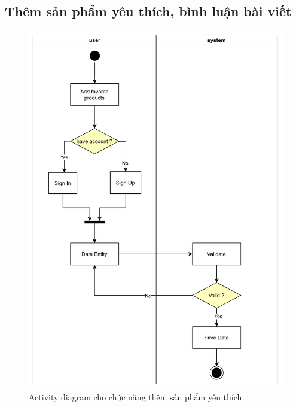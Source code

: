 \subsection{Thêm sản phẩm yêu thích, bình luận bài viết}
\begin{figure}[h]
    \centering
    \includegraphics[scale = 0.12]{img/activity/favori.png}
    \vspace{1cm}
    \caption{Activity diagram cho chức năng thêm sản phẩm yêu thích}
    \label{fig:taskAssignment}
\end{figure}

